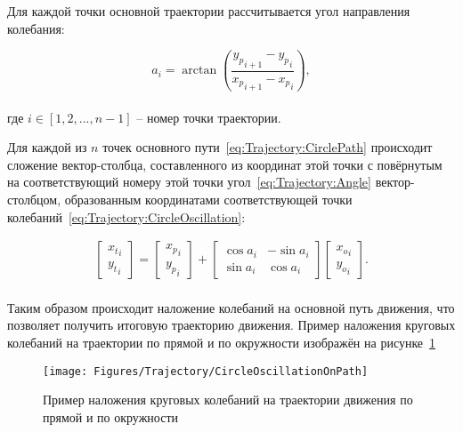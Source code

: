 Для каждой точки основной траектории рассчитывается угол направления колебания:

\begin{equation}
    \label{eq:Trajectory:Angle}
    a_i = \arctan \left( \dfrac{{y_p}_{i+1} - {y_p}_i}{{x_p}_{i+1} - {x_p}_{i}} \right),
\end{equation} \\
где $i \in [1, 2, ..., n - 1]$ -- номер точки траектории.

Для каждой из $n$ точек основного пути~\ref{eq:Trajectory:CirclePath} происходит сложение вектор-столбца, составленного из координат этой точки с повёрнутым на соответствующий номеру этой точки угол~\ref{eq:Trajectory:Angle} вектор-столбцом, образованным координатами соответствующей точки колебаний~\ref{eq:Trajectory:CircleOscillation}:

\begin{gather*}
    \begin{bmatrix}
        {x_t}_i \\
        {y_t}_i
    \end{bmatrix} =
    \begin{bmatrix}
        {x_p}_i \\
        {y_p}_i
    \end{bmatrix} +
    \begin{bmatrix}
        \cos a_i & - \sin a_i \\
        \sin a_i & \cos a_i
    \end{bmatrix}
    \begin{bmatrix}
        {x_o}_i \\
        {y_o}_i
    \end{bmatrix}.
\end{gather*} \\

Таким образом происходит наложение колебаний на основной путь движения, что позволяет получить итоговую траекторию движения.
Пример наложения круговых колебаний на траектории по прямой и по окружности изображён на рисунке~\ref{fig:Trajectory:CircleOscillationOnPath}

\begin{figure}[H]
    \centering
    \vspace{14pt}
    \texttt{[image: Figures/Trajectory/CircleOscillationOnPath]}
    \caption{Пример наложения круговых колебаний на траектории движения по прямой и по окружности}
    \label{fig:Trajectory:CircleOscillationOnPath}
\end{figure}

